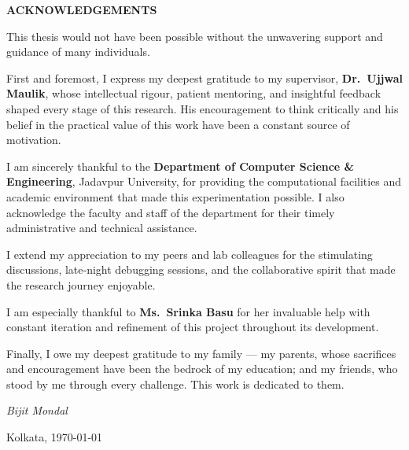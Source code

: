 \documentclass[12pt,a4paper,titlepage]{article}
\begin{document}
\begin{titlepage}
    \centering
    
    {\Large\bfseries ACKNOWLEDGEMENTS\par}
    
    \vspace{1.5cm}
    
    \begin{minipage}{0.9\textwidth}
        \setlength{\parindent}{1em}
        \setlength{\parskip}{0.6em}
        \normalsize
        
        This thesis would not have been possible without the unwavering support and guidance of many individuals.
        
        First and foremost, I express my deepest gratitude to my supervisor, \textbf{Dr.\ Ujjwal Maulik}, whose intellectual rigour, patient mentoring, and insightful feedback shaped every stage of this research. His encouragement to think critically and his belief in the practical value of this work have been a constant source of motivation.
        
        I am sincerely thankful to the \textbf{Department of Computer Science \& Engineering}, Jadavpur University, for providing the computational facilities and academic environment that made this experimentation possible. I also acknowledge the faculty and staff of the department for their timely administrative and technical assistance.
        
        I extend my appreciation to my peers and lab colleagues for the stimulating discussions, late‐night debugging sessions, and the collaborative spirit that made the research journey enjoyable.
        
        I am especially thankful to \textbf{Ms.\ Srinka Basu} for her invaluable help with constant iteration and refinement of this project throughout its development.
        
        Finally, I owe my deepest gratitude to my family — my parents, whose sacrifices and encouragement have been the bedrock of my education; and my friends, who stood by me through every challenge. This work is dedicated to them.
        
        \vspace{0.5cm}
        \begin{flushright}
            \emph{Bijit Mondal}
        \end{flushright}
    \end{minipage}
    
    \vfill
    
    {\small Kolkata, \today}
    
\end{titlepage}
\clearpage
\end{document}

